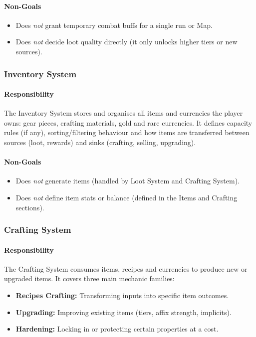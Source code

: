 \paragraph{Non-Goals}
\begin{itemize}
	\item Does \emph{not} grant temporary combat buffs for a single run or Map.
	\item Does \emph{not} decide loot quality directly (it only unlocks higher tiers or new sources).
\end{itemize}

\subsubsection*{Inventory System}

\paragraph{Responsibility}
The Inventory System stores and organises all items and currencies the player owns: gear pieces, crafting materials, 
gold and rare currencies. It defines capacity rules (if any), sorting/filtering behaviour and how items are transferred 
between sources (loot, rewards) and sinks (crafting, selling, upgrading).

\paragraph{Non-Goals}
\begin{itemize}
	\item Does \emph{not} generate items (handled by Loot System and Crafting System).
	\item Does \emph{not} define item stats or balance (defined in the Items and Crafting sections).
\end{itemize}

\subsubsection*{Crafting System}

\paragraph{Responsibility}
The Crafting System consumes items, recipes and currencies to produce new or upgraded items. 
It covers three main mechanic families:
\begin{itemize}
	\item \textbf{Recipes Crafting:} Transforming inputs into specific item outcomes.
	\item \textbf{Upgrading:} Improving existing items (tiers, affix strength, implicits).
	\item \textbf{Hardening:} Locking in or protecting certain properties at a cost.
\end{itemize}

